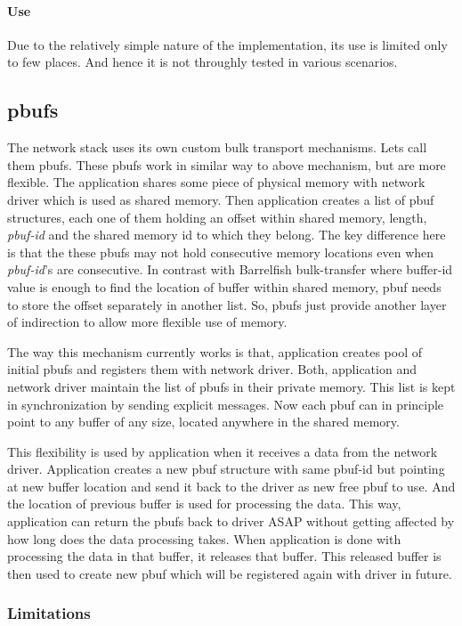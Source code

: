 \documentclass[a4paper,twoside]{report} %
\begin{document}
\paragraph{Use}
Due to the relatively simple nature of the implementation, its use is
limited only to few places. And hence it is not throughly tested in
various scenarios.  

\subsection{pbufs}
The network stack uses its own custom bulk transport mechanisms.  Lets
call them pbufs.  These pbufs work in similar way to above mechanism,
but are more flexible.  The application shares some piece of physical memory
with network driver which is used as shared memory.  Then application
creates a list of pbuf structures, each one of them holding an offset
within shared memory, length, \textit{pbuf-id} and the shared memory id to
which they belong.  The key difference here is that the these pbufs 
may not hold consecutive memory locations even when \textit{pbuf-id}'s are
consecutive.  In contrast with Barrelfish bulk-transfer where buffer-id
value is enough to find the location of buffer within shared memory,
pbuf needs to store the offset separately in another list.  So,
pbufs just provide another layer of indirection to allow more
flexible use of memory.


The way this mechanism currently works is that, application creates
pool of initial pbufs and registers them with network driver.  Both,
application and network driver maintain the list of pbufs in their
private memory.  This list is kept in synchronization by sending
explicit messages.  Now each pbuf can in principle point to any
buffer of any size, located anywhere in the shared memory.


This flexibility is used by application when it receives a data from
the network driver.  Application creates a new pbuf structure with
same pbuf-id but pointing at new buffer location and send it back to
the driver as new free pbuf to use.  And the location of previous
buffer is used for processing the data.  This way, application can
return the pbufs back to driver ASAP without getting affected by how
long does the data processing takes.  When application is done with
processing the data in that buffer, it releases that buffer.  This
released buffer is then used to create new pbuf which will be
registered again with driver in future. 

\subsubsection{Limitations}
\end{document}
